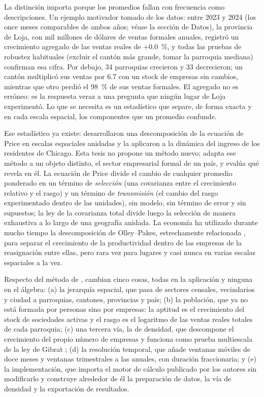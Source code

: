 \documentclass[12pt,a4paper]{article}
\begin{document}
\par\vspace{6pt}
La distinción importa porque los promedios fallan con frecuencia como descripciones. Un ejemplo motivador tomado de los datos: entre 2023 y 2024 (los once meses comparables de ambos años; véase la sección de Datos), la provincia de Loja, con mil millones de dólares de ventas formales anuales, registró un crecimiento agregado de las ventas reales de $+0.0$~\%, y todas las pruebas de robustez habituales (excluir el cantón más grande, tomar la parroquia mediana) confirman esa cifra. Por debajo, 34 parroquias crecieron y 33 decrecieron; un cantón multiplicó sus ventas por 6.7 con un stock de empresas sin cambios, mientras que otro perdió el 98~\% de sus ventas formales. El agregado no es erróneo: es la respuesta veraz a una pregunta que ningún lugar de Loja experimentó. Lo que se necesita es un estadístico que separe, de forma exacta y en cada escala espacial, los componentes que un promedio confunde.
\par\vspace{6pt}
Ese estadístico ya existe: \textcite{kemp2025} desarrollaron una descomposición de la ecuación de Price en escalas espaciales anidadas y la aplicaron a la dinámica del ingreso de los residentes de Chicago. Esta tesis no propone un método nuevo; adapta ese método a un objeto distinto, el sector empresarial formal de un país, y evalúa qué revela en él. La ecuación de Price \parencite{price1970,frank2012} divide el cambio de cualquier promedio ponderado en un término de \textit{selección} (una covarianza entre el crecimiento relativo y el rasgo) y un término de \textit{transmisión} (el cambio del rasgo experimentado dentro de las unidades), sin modelo, sin término de error y sin supuestos; la ley de la covarianza total divide luego la selección de manera exhaustiva a lo largo de una geografía anidada. La economía ha utilizado durante mucho tiempo la descomposición de Olley--Pakes, estrechamente relacionada \parencite{olleypakes1996,melitz2015}, para separar el crecimiento de la productividad dentro de las empresas de la reasignación entre ellas, pero rara vez para lugares y casi nunca en varias escalas espaciales a la vez.
\par\vspace{6pt}
Respecto del método de \textcite{kemp2025}, cambian cinco cosas, todas en la aplicación y ninguna en el álgebra: (a) la jerarquía espacial, que pasa de sectores censales, vecindarios y ciudad a parroquias, cantones, provincias y país; (b) la población, que ya no está formada por personas sino por empresas: la aptitud es el crecimiento del stock de sociedades activas y el rasgo es el logaritmo de las ventas reales totales de cada parroquia; (c) una tercera vía, la de densidad, que descompone el crecimiento del propio número de empresas y funciona como prueba multiescala de la ley de Gibrat \parencite{gibrat1931,sutton1997}; (d) la resolución temporal, que añade ventanas móviles de doce meses y ventanas trimestrales a las anuales, con duración fraccionaria; y (e) la implementación, que importa el motor de cálculo publicado por los autores sin modificarlo y construye alrededor de él la preparación de datos, la vía de densidad y la exportación de resultados.
\end{document}
